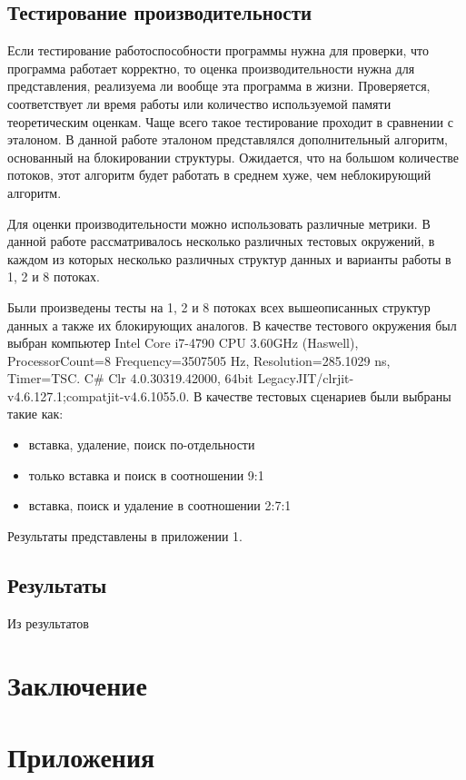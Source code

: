 \documentclass[12pt]{article}
\begin{document}
{				\subsection{Тестирование производительности}
					\par Если тестирование работоспособности программы нужна для проверки, что программа работает корректно, то оценка производительности нужна для представления, реализуема ли вообще эта программа в жизни. Проверяется, соответствует ли время работы или количество используемой памяти теоретическим оценкам. Чаще всего такое тестирование проходит в сравнении с эталоном. В данной работе эталоном представлялся дополнительный алгоритм, основанный на блокировании структуры. Ожидается, что на большом количестве потоков, этот алгоритм будет работать в среднем хуже, чем неблокирующий алгоритм.
					\par Для оценки производительности можно использовать различные метрики. В данной работе рассматривалось несколько различных тестовых окружений, в каждом из которых несколько различных структур данных и варианты работы в 1, 2 и 8 потоках. 
					\par Были произведены тесты на 1, 2 и 8 потоках всех вышеописанных структур данных а также их блокирующих аналогов. В качестве тестового окружения был выбран компьютер Intel Core i7-4790 CPU 3.60GHz (Haswell), ProcessorCount=8 Frequency=3507505 Hz, Resolution=285.1029 ns, Timer=TSC. C\# Clr 4.0.30319.42000, 64bit LegacyJIT/clrjit-v4.6.127.1;compatjit-v4.6.1055.0.
					В качестве тестовых сценариев были выбраны такие как: 
					\begin{itemize}
						\item вставка, удаление, поиск по-отдельности
						\item только вставка и поиск в соотношении 9:1
						\item вставка, поиск и удаление в соотношении 2:7:1			
					\end{itemize}
					\par Результаты представлены в приложении 1.
				\subsection{Результаты}
					\par Из результатов 
				
				
		\newpage
		
		\section{Заключение}
		
		\newpage
			
			  
		
		\newpage
		
		\section{Приложения}
	}
	
\end{document}

